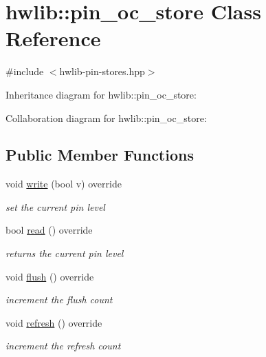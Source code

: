 \hypertarget{classhwlib_1_1pin__oc__store}{}\section{hwlib\+:\+:pin\+\_\+oc\+\_\+store Class Reference}
\label{classhwlib_1_1pin__oc__store}


{\ttfamily \#include $<$hwlib-\/pin-\/stores.\+hpp$>$}



Inheritance diagram for hwlib\+:\+:pin\+\_\+oc\+\_\+store\+:


Collaboration diagram for hwlib\+:\+:pin\+\_\+oc\+\_\+store\+:
\subsection*{Public Member Functions}
\begin{DoxyCompactItemize}
\item 
\mbox{\label{classhwlib_1_1pin__oc__store_a160171c403e03d8abdc7480bc7475dff}} 
void \hyperlink{classhwlib_1_1pin__oc__store_a160171c403e03d8abdc7480bc7475dff}{write} (bool v) override
\begin{DoxyCompactList}\small\item\em set the current pin level \end{DoxyCompactList}\item 
\mbox{\label{classhwlib_1_1pin__oc__store_a20ffb88febe8d86f2686ed937ab6bc5a}} 
bool \hyperlink{classhwlib_1_1pin__oc__store_a20ffb88febe8d86f2686ed937ab6bc5a}{read} () override
\begin{DoxyCompactList}\small\item\em returns the current pin level \end{DoxyCompactList}\item 
\mbox{\label{classhwlib_1_1pin__oc__store_a34885dcd712db6db9fc5ef9559ac34de}} 
void \hyperlink{classhwlib_1_1pin__oc__store_a34885dcd712db6db9fc5ef9559ac34de}{flush} () override
\begin{DoxyCompactList}\small\item\em increment the flush count \end{DoxyCompactList}\item 
\mbox{\label{classhwlib_1_1pin__oc__store_ac78956e4f8a142e4fa4076bddd1db190}} 
void \hyperlink{classhwlib_1_1pin__oc__store_ac78956e4f8a142e4fa4076bddd1db190}{refresh} () override
\begin{DoxyCompactList}\small\item\em increment the refresh count \end{DoxyCompactList}\end{DoxyCompactItemize}
